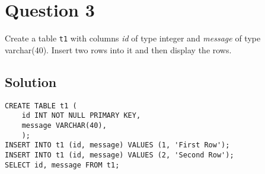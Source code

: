 
\section*{Question 3}

Create a table \texttt{t1} with columns \textit{id} of type integer and \textit{message} of type varchar(40). Insert two rows into it and then display the rows.

\subsection*{Solution}

\begin{lstlisting}
CREATE TABLE t1 (
	id INT NOT NULL PRIMARY KEY,
	message VARCHAR(40),
	);
INSERT INTO t1 (id, message) VALUES (1, 'First Row');
INSERT INTO t1 (id, message) VALUES (2, 'Second Row');
SELECT id, message FROM t1;
\end{lstlisting}
